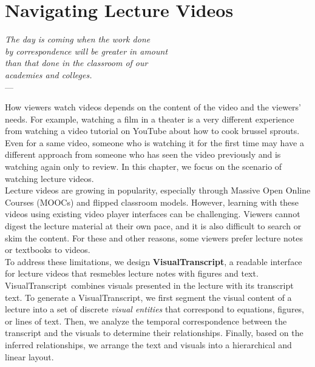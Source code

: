 \newcommand{\systemname}[0]{VisualTranscript}


\chapter{Navigating Lecture Videos} %
\label{ch:visualtranscript} %
%
\begin{flushright}{\slshape    
The day is coming when the work done\\
by correspondence will be greater in amount\\
than that done in the classroom of our\\
academies and colleges.} \\ \medskip
---  \citep{harper:1886}
\end{flushright}
How viewers watch videos depends on the content of the video and the viewers'
needs. For example, watching a film in a theater is a very different experience
from watching a video tutorial on YouTube about how to cook brussel sprouts.
Even for a same video, someone who is watching it for the first time may have a
different approach from someone who has seen the video previously and is
watching again only to review. In this chapter, we focus on the scenario of
watching lecture videos. \\

Lecture videos are growing in popularity, especially through Massive Open Online Courses
(MOOCs) and flipped classroom models.
However, learning with these videos using existing video player interfaces can
be challenging. Viewers cannot digest the lecture material at their
own pace, and it is also difficult to search or skim the content. For these and other
reasons, some viewers prefer lecture notes or textbooks to videos.\\

To address these limitations, we design \textbf{\systemname}, a readable
interface for lecture videos that resmebles lecture notes with figures and text.
\systemname\ combines visuals presented in the lecture
with its transcript text. To generate a \systemname, we first segment the visual content
of a lecture into a set of discrete \emph{visual entities} that correspond to equations, figures, or lines of text. Then, we analyze
the temporal correspondence between the transcript and the visuals to determine their relationships. Finally, based on the inferred relationships, we arrange the text and visuals into a hierarchical and linear layout. \\

